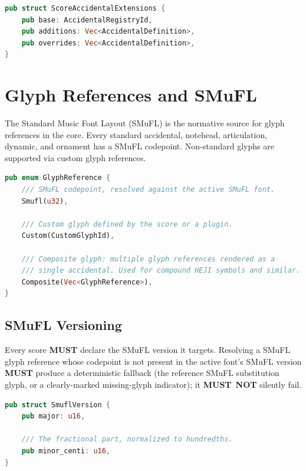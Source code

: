 \documentclass[11pt,letterpaper]{report}
\newcounter{requirement}[chapter]
\newcommand{\MUST}{\textbf{MUST}}
\newcommand{\MUSTNOT}{\textbf{MUST}\nobreak\ \textbf{NOT}}
\begin{document}
\begin{lstlisting}[language=Rust]
pub struct ScoreAccidentalExtensions {
    pub base: AccidentalRegistryId,
    pub additions: Vec<AccidentalDefinition>,
    pub overrides: Vec<AccidentalDefinition>,
}
\end{lstlisting}

\section{Glyph References and SMuFL}
\label{sec:tuning:smufl}

The Standard Music Font Layout (SMuFL) is the normative source for
glyph references in the core. Every standard accidental, notehead,
articulation, dynamic, and ornament has a SMuFL codepoint. Non-standard
glyphs are supported via custom glyph references.

\begin{lstlisting}[language=Rust]
pub enum GlyphReference {
    /// SMuFL codepoint, resolved against the active SMuFL font.
    Smufl(u32),

    /// Custom glyph defined by the score or a plugin.
    Custom(CustomGlyphId),

    /// Composite glyph: multiple glyph references rendered as a
    /// single accidental. Used for compound HEJI symbols and similar.
    Composite(Vec<GlyphReference>),
}
\end{lstlisting}

\subsection{SMuFL Versioning}

\begin{requirement}
  \label{req:tuning:smufl-version-fallback}
  Every score \MUST{} declare the SMuFL version it targets. Resolving a
  SMuFL glyph reference whose codepoint is not present in the active
  font's SMuFL version \MUST{} produce a deterministic fallback (the
  reference SMuFL substitution glyph, or a clearly-marked missing-glyph
  indicator); it \MUSTNOT{} silently fail.
\end{requirement}

\begin{lstlisting}[language=Rust]
pub struct SmuflVersion {
    pub major: u16,

    /// The fractional part, normalized to hundredths.
    pub minor_centi: u16,
}
\end{lstlisting}
\end{document}

